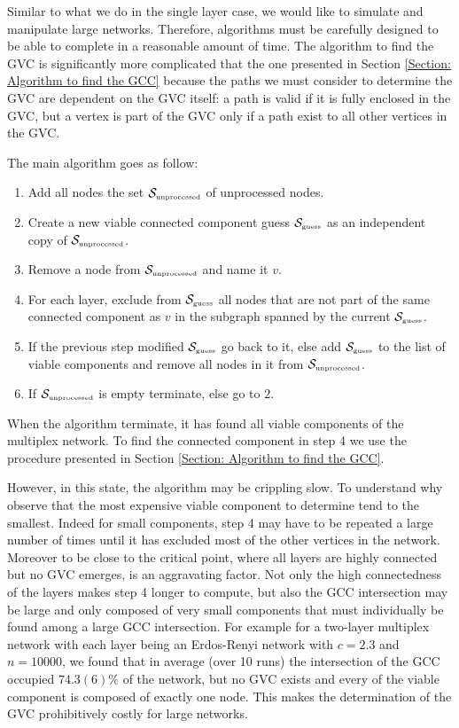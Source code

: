 \documentclass[
11pt, %
english, %
singlespacing, %
nolistspacing, %
liststotoc, %
headsepline, %
]{MastersDoctoralThesis} %
\begin{document}

Similar to what we do in the single layer case, we would like to simulate and manipulate large networks. Therefore, algorithms must be carefully designed to be able to complete in a reasonable amount of time. The algorithm to find the GVC is significantly more complicated that the one presented in Section \ref{Section: Algorithm to find the GCC} because the paths we must consider to determine the GVC are dependent on the GVC itself: a path is valid if it is fully enclosed in the GVC, but a vertex is part of the GVC only if a path exist to all other vertices in the GVC. 

The main algorithm goes as follow:

\begin{enumerate}
	\item Add all nodes the set $\mathcal{S}_{\text{\tiny unprocessed}}$ of unprocessed nodes.
	\item Create a new viable connected component guess $\mathcal{S}_{\text{\tiny guess}}$ as an independent copy of $\mathcal{S}_{\text{\tiny unprocessed}}$.
	\item Remove a node from $\mathcal{S}_{\text{\tiny unprocessed}}$ and name it $v$.
	\item For each layer, exclude from $\mathcal{S}_{\text{\tiny guess}}$ all nodes that are not part of the same connected component as $v$ in the subgraph spanned by the current $\mathcal{S}_{\text{\tiny guess}}$.
	\item If the previous step modified $\mathcal{S}_{\text{\tiny guess}}$ go back to it, else add $\mathcal{S}_{\text{\tiny guess}}$ to the list of viable components and remove all nodes in it from $\mathcal{S}_{\text{\tiny unprocessed}}$.
	\item If $\mathcal{S}_{\text{\tiny unprocessed}}$ is empty terminate, else go to $2$.
\end{enumerate}

When the algorithm terminate, it has found all viable components of the multiplex network. To find the connected component in step 4 we use the procedure presented in Section \ref{Section: Algorithm to find the GCC}.

However, in this state, the algorithm may be crippling slow. To understand why observe that the most expensive viable component to determine tend to the smallest. Indeed for small components, step 4 may have to be repeated a large number of times until it has excluded most of the other vertices in the network. Moreover to be close to the critical point, where all layers are highly connected but no GVC emerges, is an aggravating factor. Not only the high connectedness of the layers makes step 4 longer to compute, but also the GCC intersection may be large and only composed of very small components that must individually be found among a large GCC intersection. For example for a two-layer multiplex network with each layer being an Erdos-Renyi network with $c = 2.3$ and $n = 10000$, we found that in average (over 10 runs) the intersection of the GCC occupied $74.3(6) \%$ of the network, but  no GVC exists and every of the viable component is composed of exactly one node. This makes the determination of the GVC prohibitively costly for large networks.
\end{document}
